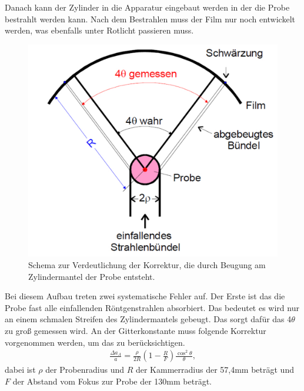 Danach kann der Zylinder in die Apparatur eingebaut werden in der die Probe bestrahlt werden kann.
Nach dem Bestrahlen muss der Film nur noch entwickelt werden, was ebenfalls unter Rotlicht passieren muss.
\FloatBarrier
\begin{figure}[h!]
	\centering
	\includegraphics[scale=0.4]{../Grafiken/ErsteKorrektur.pdf}
	\caption{Schema zur Verdeutlichung der Korrektur, die durch Beugung am Zylindermantel der Probe entsteht\cite{V41}.}
\end{figure}
\FloatBarrier
Bei diesem Aufbau treten zwei systematische Fehler auf. Der Erste ist das die Probe fast alle einfallenden Röntgenstrahlen absorbiert. Das bedeutet es wird nur an einem schmalen Streifen des Zylindermantels gebeugt. Das sorgt dafür das 4$\theta$ zu groß gemessen wird. An der Gitterkonstante muss folgende Korrektur vorgenommen werden, um das zu berücksichtigen.
\begin{align}
	\frac{\Delta a_A}{a}=\frac{\rho}{2R}\left(1-\frac{R}{F}\right)\frac{\cos^2\theta}{\theta},
\end{align}
dabei ist $\rho$ der Probenradius und $R$ der Kammerradius der 57,4mm beträgt und $F$ der Abstand vom Fokus zur Probe der 130mm beträgt.\\
\FloatBarrier
